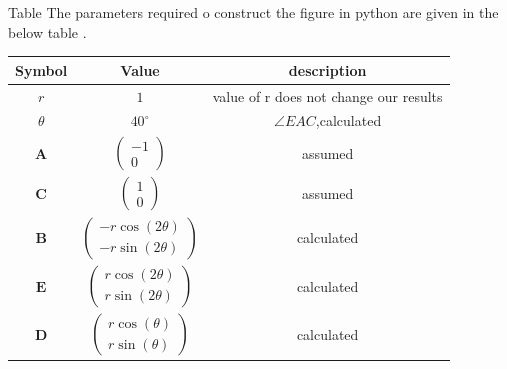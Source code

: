 \documentclass{beamer}
\let\vec\mathbf
\newcommand{\myvec}[1]{\ensuremath{\begin{pmatrix}#1\end{pmatrix}}}
\begin{document}
   \begin{frame}{Table}
   The parameters required o construct the figure in python are given in the below table .    
      
\begin{table}[h!]
    \centering
    \begin{tabular}{|c|c|c|} \hline
    \textbf{Symbol} & \textbf{Value} & \textbf{description} \\ \hline
 $r$ & $1$ &  value of r does not change our results \\ \hline
 $\theta$ & $40^{\circ}$ & $\angle EAC$,calculated \\ \hline
 $\vec{A}$ &  $\myvec{-1\\0}$  & assumed\\ \hline 
 $\vec{C}$ & $\myvec{1\\0}$ & assumed \\ \hline
 $\vec{B}$ & $\myvec{-r\cos(2\theta)\\-r\sin(2\theta)}$ & calculated \\ \hline
 $\vec{E}$ & $\myvec{r\cos(2\theta)\\r\sin(2\theta)}$ & calculated \\ \hline
 $\vec{D}$ & $\myvec{r\cos(\theta)\\r\sin(\theta)}$ & calculated \\ \hline
 \end{tabular}
    \label{tab:my_label}
\end{table}
\end{frame}
\end{document}
